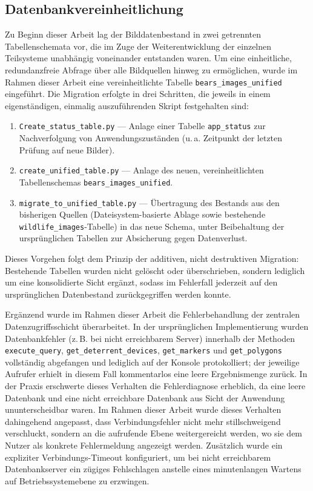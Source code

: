 \documentclass[12pt,a4paper]{report}
\begin{document}
\subsection{Datenbankvereinheitlichung}

Zu Beginn dieser Arbeit lag der Bilddatenbestand in zwei getrennten Tabellenschemata vor, die im Zuge der Weiterentwicklung der einzelnen Teilsysteme unabhängig voneinander entstanden waren. Um eine einheitliche, redundanzfreie Abfrage über alle Bildquellen hinweg zu ermöglichen, wurde im Rahmen dieser Arbeit eine vereinheitlichte Tabelle \texttt{bears\_images\_unified} eingeführt. Die Migration erfolgte in drei Schritten, die jeweils in einem eigenständigen, einmalig auszuführenden Skript festgehalten sind:

\begin{enumerate}
    \item \texttt{Create\_status\_table.py} — Anlage einer Tabelle \texttt{app\_status} zur Nachverfolgung von Anwendungszuständen (u.\,a. Zeitpunkt der letzten Prüfung auf neue Bilder).
    \item \texttt{create\_unified\_table.py} — Anlage des neuen, vereinheitlichten Tabellenschemas \texttt{bears\_images\_unified}.
    \item \texttt{migrate\_to\_unified\_table.py} — Übertragung des Bestands aus den bisherigen Quellen (Dateisystem-basierte Ablage sowie bestehende \texttt{wildlife\_images}-Tabelle) in das neue Schema, unter Beibehaltung der ursprünglichen Tabellen zur Absicherung gegen Datenverlust.
\end{enumerate}

Dieses Vorgehen folgt dem Prinzip der additiven, nicht destruktiven Migration: Bestehende Tabellen wurden nicht gelöscht oder überschrieben, sondern lediglich um eine konsolidierte Sicht ergänzt, sodass im Fehlerfall jederzeit auf den ursprünglichen Datenbestand zurückgegriffen werden konnte.

Ergänzend wurde im Rahmen dieser Arbeit die Fehlerbehandlung der zentralen Datenzugriffsschicht überarbeitet. In der ursprünglichen Implementierung wurden Datenbankfehler (z.\,B. bei nicht erreichbarem Server) innerhalb der Methoden \texttt{execute\_query}, \texttt{get\_deterrent\_devices}, \texttt{get\_markers} und \texttt{get\_polygons} vollständig abgefangen und lediglich auf der Konsole protokolliert; der jeweilige Aufrufer erhielt in diesem Fall kommentarlos eine leere Ergebnismenge zurück. In der Praxis erschwerte dieses Verhalten die Fehlerdiagnose erheblich, da eine leere Datenbank und eine nicht erreichbare Datenbank aus Sicht der Anwendung ununterscheidbar waren. Im Rahmen dieser Arbeit wurde dieses Verhalten dahingehend angepasst, dass Verbindungsfehler nicht mehr stillschweigend verschluckt, sondern an die aufrufende Ebene weitergereicht werden, wo sie dem Nutzer als konkrete Fehlermeldung angezeigt werden. Zusätzlich wurde ein expliziter Verbindungs-Timeout konfiguriert, um bei nicht erreichbarem Datenbankserver ein zügiges Fehlschlagen anstelle eines minutenlangen Wartens auf Betriebssystemebene zu erzwingen.
\end{document}
